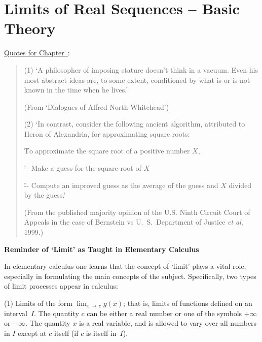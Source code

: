 
%
%

                  \chapter{Limits of Real Sequences -- Basic Theory}
                  \label{ChaptC}


        \underline{Quotes for Chapter~}: 

\V

\begin{quotation}
{\footnotesize
        (1) `A philosopher of imposing stature doesn't think in a vacuum. Even his most abstract ideas are, to some extent, conditioned by what is or is not known in the time when he lives.'

        (From `Dialogues of Alfred North Whitehead') %

\V  

        (2) `In contrast, consider the following ancient algorithm, attributed to Heron of Alexandria, for approximating square roots:

        \h To approximate the square root of a positive number $X$,

        \h \h -- Make a guess for the square root of $X$

        \h \h -- Compute an improved guess as the average of the guess and $X$ divided by the guess.'

        (From the published majority opinion of the U.S. Ninth Circuit Court of Appeals in the case of Bernstein vs U.~S.~Department of Justice {\em et al}, 1999.)
}%
\end{quotation}


\VV

            \small{\bf Reminder of `Limit' as Taught in Elementary Calculus}

\V

        In elementary calculus one learns that the concept of `limit' plays a vital role, especially in formulating the main concepts of the subject.
    Specifically, two types of limit processes appear in calculus:


        (1) Limits of the form ${\displaystyle \lim_{x \,{\rightarrow}\, c} g(x)}$;
    that is, limits of functions defined on an interval~$I$. The quantity $c$ can be either a real number or one of the symbols $+{\infty}$ or $-{\infty}$.
    The quantity $x$ is a real variable, and is allowed to vary over all numbers in $I$ except at $c$ itself (if $c$ is itself in~$I$).

